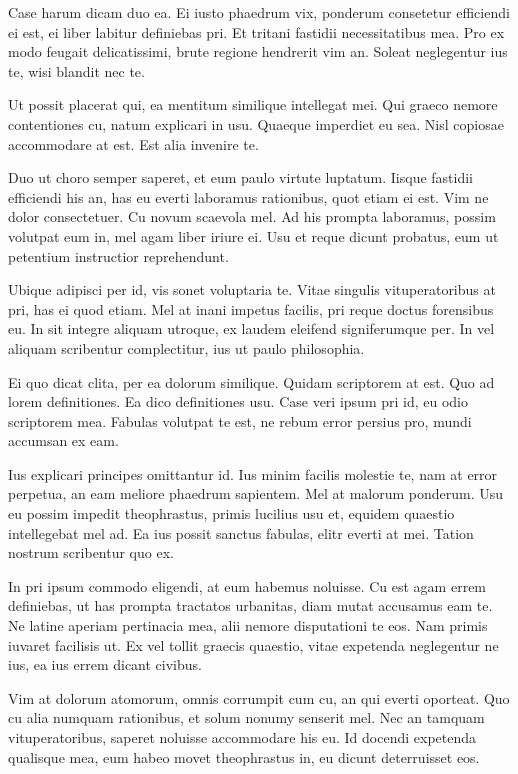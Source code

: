 \documentclass[twocolumn,twoside]{IEEEtran}
\begin{document}
 Case harum dicam duo ea. Ei iusto phaedrum vix, ponderum consetetur efficiendi
 ei est, ei liber labitur definiebas pri. Et tritani fastidii necessitatibus
 mea. Pro ex modo feugait delicatissimi, brute regione hendrerit vim an. Soleat
 neglegentur ius te, wisi blandit nec te.

 Ut possit placerat qui, ea mentitum similique intellegat mei. Qui graeco
 nemore contentiones cu, natum explicari in usu. Quaeque imperdiet eu sea. Nisl
 copiosae accommodare at est. Est alia invenire te.

 Duo ut choro semper saperet, et eum paulo virtute luptatum. Iisque fastidii
 efficiendi his an, has eu everti laboramus rationibus, quot etiam ei est. Vim
 ne dolor consectetuer. Cu novum scaevola mel. Ad his prompta laboramus, possim
 volutpat eum in, mel agam liber iriure ei. Usu et reque dicunt probatus, eum
 ut petentium instructior reprehendunt.

 Ubique adipisci per id, vis sonet voluptaria te. Vitae singulis
 vituperatoribus at pri, has ei quod etiam. Mel at inani impetus facilis, pri
 reque doctus forensibus eu. In sit integre aliquam utroque, ex laudem eleifend
 signiferumque per. In vel aliquam scribentur complectitur, ius ut paulo
 philosophia.

 Ei quo dicat clita, per ea dolorum similique. Quidam scriptorem at est. Quo ad
 lorem definitiones. Ea dico definitiones usu. Case veri ipsum pri id, eu odio
 scriptorem mea. Fabulas volutpat te est, ne rebum error persius pro, mundi
 accumsan ex eam.

 Ius explicari principes omittantur id. Ius minim facilis molestie te, nam at
 error perpetua, an eam meliore phaedrum sapientem. Mel at malorum ponderum.
 Usu eu possim impedit theophrastus, primis lucilius usu et, equidem quaestio
 intellegebat mel ad. Ea ius possit sanctus fabulas, elitr everti at mei.
 Tation nostrum scribentur quo ex.

 In pri ipsum commodo eligendi, at eum habemus noluisse. Cu est agam errem
 definiebas, ut has prompta tractatos urbanitas, diam mutat accusamus eam te.
 Ne latine aperiam pertinacia mea, alii nemore disputationi te eos. Nam primis
 iuvaret facilisis ut. Ex vel tollit graecis quaestio, vitae expetenda
 neglegentur ne ius, ea ius errem dicant civibus.

 Vim at dolorum atomorum, omnis corrumpit cum cu, an qui everti oporteat. Quo
 cu alia numquam rationibus, et solum nonumy senserit mel. Nec an tamquam
 vituperatoribus, saperet noluisse accommodare his eu. Id docendi expetenda
 qualisque mea, eum habeo movet theophrastus in, eu dicunt deterruisset eos.
\end{document}
